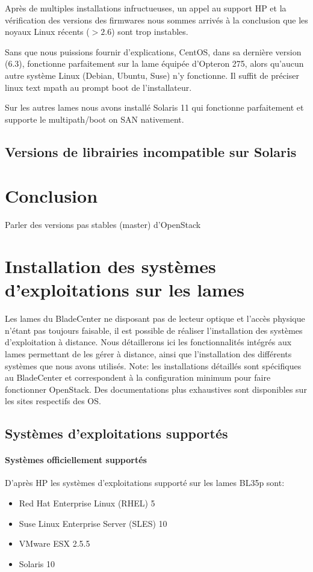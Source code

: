 \documentclass[a4paper,oneside]{report}
\begin{document}
Après de multiples installations infructueuses, un appel au support HP et la vérification des versions des firmwares nous sommes arrivés à la conclusion que les noyaux Linux récents ($ > 2.6 $) sont trop instables.

Sans que nous puissions fournir d'explications, CentOS, dans sa dernière version (6.3), fonctionne parfaitement sur la lame équipée d'Opteron 275, alors qu'aucun autre système Linux (Debian, Ubuntu, Suse) n'y fonctionne.
Il suffit de préciser linux text mpath au prompt boot de l'installateur.

Sur les autres lames nous avons installé Solaris 11 qui fonctionne parfaitement et supporte le multipath/boot on SAN nativement.

\section{Versions de librairies incompatible sur Solaris}
\label{sec:libsolaris}

\chapter{Conclusion}
Parler des versions pas stables (master) d'OpenStack

\appendix
\chapter{Installation des systèmes d'exploitations sur les lames}
Les lames du BladeCenter ne disposant pas de lecteur optique et l'accès physique n'étant pas toujours faisable, il est possible de réaliser l'installation des systèmes d'exploitation à distance.
Nous détaillerons ici les fonctionnalités intégrés aux lames permettant de les gérer à distance, ainsi que l'installation des différents systèmes que nous avons utilisés.\newline
Note: les installations détaillés sont spécifiques au BladeCenter et correspondent à la configuration minimum pour faire fonctionner OpenStack. Des documentations plus exhaustives sont disponibles sur les sites respectifs des OS.

\section{Systèmes d'exploitations supportés}
\subsubsection{Systèmes officiellement supportés}
D'après HP les systèmes d'exploitations supporté sur les lames BL35p sont:
\begin{itemize}
\item Red Hat Enterprise Linux (RHEL) 5
\item Suse Linux Enterprise Server (SLES) 10
\item VMware ESX 2.5.5
\item Solaris 10
\end{itemize}
\end{document}
